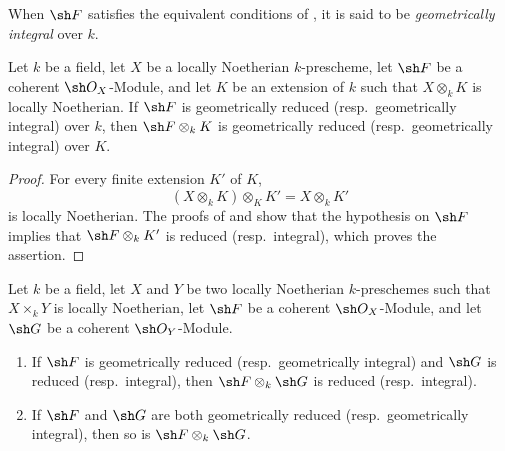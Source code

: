 \begin{definition}[4.6.19]
\label{IV.4.6.19}
When $\sh F$ satisfies the equivalent conditions of
, it is said to be \emph{geometrically integral} over
$k$.
\end{definition}

\begin{proposition}[4.6.20]
\label{IV.4.6.20}
Let $k$ be a field, let $X$ be a locally Noetherian $k$-prescheme,
let $\sh F$ be a coherent $\sh O_X$-Module, and let $K$ be an
extension of $k$ such that $X\otimes_kK$ is locally Noetherian.
If $\sh F$ is geometrically reduced
(resp.\ geometrically integral) over $k$, then
$\sh F\otimes_kK$ is geometrically reduced
(resp.\ geometrically integral) over $K$.
\end{proposition}

\begin{proof}
For every finite extension $K'$ of $K$,
\[
 (X\otimes_kK)\otimes_KK'=X\otimes_kK'
\]
is locally Noetherian.
The proofs of  and  show that the
hypothesis on $\sh F$ implies that $\sh F\otimes_kK'$ is reduced
(resp.\ integral), which proves the assertion.
\end{proof}

\begin{proposition}[4.6.21]
\label{IV.4.6.21}
Let $k$ be a field, let $X$ and $Y$ be two locally Noetherian
$k$-preschemes such that $X\times_kY$ is locally Noetherian, let
$\sh F$ be a coherent $\sh O_X$-Module, and let $\sh G$ be a coherent
$\sh O_Y$-Module.
\begin{enumerate}
\item[\rm(i)]
\label{IV.4.6.21.i}
If $\sh F$ is geometrically reduced
(resp.\ geometrically integral) and $\sh G$ is reduced
(resp.\ integral), then $\sh F\otimes_k\sh G$ is reduced
(resp.\ integral).

\item[\rm(ii)]
\label{IV.4.6.21.ii}
If $\sh F$ and $\sh G$ are both geometrically reduced
(resp.\ geometrically integral), then so is
$\sh F\otimes_k\sh G$.
\end{enumerate}
\end{proposition}

